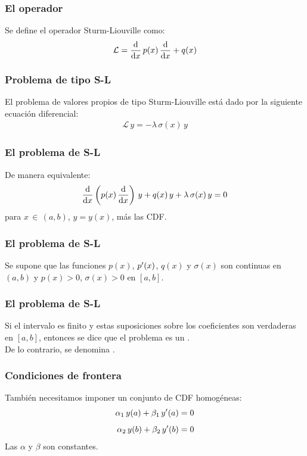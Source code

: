 \documentclass[12pt]{beamer}
\begin{document}
\begin{frame}
\frametitle{El operador}
Se define el operador Sturm-Liouville como:
\pause
\begin{align}
\mathcal{L} = \dv{x} \, p(x) \, \dv{x} + q(x)
\label{eq:ecuacion_04_02}
\end{align}
\end{frame}
\begin{frame}
\frametitle{Problema de tipo S-L}
El problema de valores propios de tipo Sturm-Liouville está dado por la siguiente ecuación diferencial:
\pause
\begin{align*}
\mathcal{L} \, y = - \lambda \, \sigma(x) \, y
\end{align*}
\end{frame}
\begin{frame}
\frametitle{El problema de S-L}
De manera equivalente:
\pause
\begin{align}
\dv{x} \left( p(x) \, \dv{x} \right) \, y + q(x) \, y + \lambda \, \sigma (x) \, y = 0
\label{eq:ecuacion_04_03}
\end{align}
para $x \, \in \, (a, b)$, $y = y (x)$, más las CDF.
\end{frame}
\begin{frame}
\frametitle{El problema de S-L}    
Se supone que las funciones $p (x)$, ${p}^{\prime} (x)$, $q (x)$ y $\sigma (x)$ son continuas en $(a, b)$ y $p (x) > 0$, $\sigma (x) > 0$ en $[a , b]$.
\end{frame}
\begin{frame}
\frametitle{El problema de S-L}    
Si el intervalo es finito y estas suposiciones sobre los coeficientes son verdaderas en $[a, b]$, entonces se dice que el problema es un .
\\
\bigskip
\pause
De lo contrario, se denomina .
\end{frame}
\begin{frame}
\frametitle{Condiciones de frontera}
También necesitamos imponer un conjunto de CDF homogéneas:
\pause
\begin{align}
\begin{aligned}
\alpha_{1} \, y(a) + \beta_{1} \, {y}^{\prime} (a) &= 0 \\[0.5em]
\alpha_{2} \, y(b) + \beta_{2} \, {y}^{\prime} (b) &= 0
\end{aligned}
\label{eq:ecuacion_04_04}
\end{align}
Las $\alpha$ y $\beta$ son constantes.
\end{frame}
\end{document}
